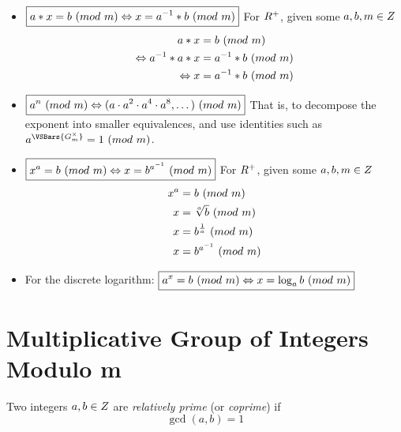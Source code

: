 \begin{itemize}
    \item $\boxed{a \ast x = b \ (\relax{mod}\ m) \Leftrightarrow x = {a}^{-1} \ast b \ (\relax{mod}\ m)}$
        \subitem For $\relax{R}^{+}$, given some $a, b, m \in \relax{Z}$
        \begin{align}
            a \ast x                                  &= b \ (\relax{mod}\ m) \\
            \Leftrightarrow {a}^{-1} \ast a \ast x &= {a}^{-1} \ast b \ (\relax{mod}\ m) \\
            \Leftrightarrow x                         &= {a}^{-1} \ast b \ (\relax{mod}\ m)
        \end{align}
    \item $\boxed{a^n \ (\relax{mod}\ m) \Leftrightarrow (a \cdot a^2 \cdot a^4 \cdot a^8, \dots) \ (\relax{mod}\ m)}$
        \subitem That is, to decompose the exponent into smaller equivalences, and use identities such as $a^{\VSBars{G^{\times}_{m}}} = 1 \Mod{m}$.
    \item $\boxed{x^a = b \ (\relax{mod}\ m) \Leftrightarrow x = b^{{a}^{-1}} \ (\relax{mod}\ m)}$
        \subitem For $\relax{R}^{+}$, given some $a, b, m \in \relax{Z}$
        \begin{align}
            x^a &= b \ (\relax{mod}\ m) \\
            x   &= \sqrt[a]{b} \ (\relax{mod}\ m) \\
            x   &= b^{\frac{1}{a}} \ (\relax{mod}\ m) \\
            x   &= b^{{a}^{-1}} \ (\relax{mod}\ m)
        \end{align}
    \item For the discrete logarithm: $\boxed{a^x = b \ (\relax{mod}\ m) \Leftrightarrow x = \log_a{b} \ (\relax{mod}\ m)}$
\end{itemize}

\section{Multiplicative Group of Integers Modulo m}

\begin{definition}
    Two integers $a, b \in \relax{Z}$ are \textit{relatively prime} (or \textit{coprime}) if
    \begin{equation}
        \gcd(a, b) = 1
    \end{equation}
\end{definition}

